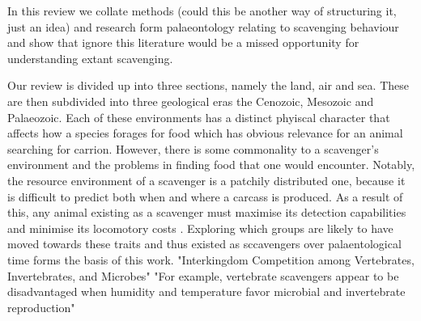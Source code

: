 \documentclass[a4paper,12pt]{article}
\begin{document}
In this review we collate methods (could this be another way of structuring it, just an idea) and research form palaeontology relating to scavenging behaviour and show that ignore this literature would be a missed opportunity for understanding extant scavenging.


Our review is divided up into three sections, namely the land, air and sea. 
These are then subdivided into three geological eras the Cenozoic, Mesozoic and Palaeozoic. 
Each of these environments has a distinct phyiscal character that affects how a species forages for food which has obvious relevance for an animal searching for carrion.  
However, there is some commonality to a scavenger's environment and the problems in finding food that one would encounter. 
Notably, the resource environment of a scavenger is a patchily distributed one, because it is difficult to predict both when and where a carcass is produced. 
As a result of this, any animal existing as a scavenger must maximise its detection capabilities and minimise its locomotory costs \citep{ruxton2004obligate}.
Exploring which groups are likely to have moved towards these traits and thus existed as sccavengers over palaentological time forms the basis of this work.
"Interkingdom Competition among Vertebrates, Invertebrates, and Microbes"\citep{benbow2015introduction}
"For example, vertebrate scavengers appear to be disadvantaged when humidity and temperature favor microbial and invertebrate reproduction" \citep{benbow2015introduction}
\end{document}
